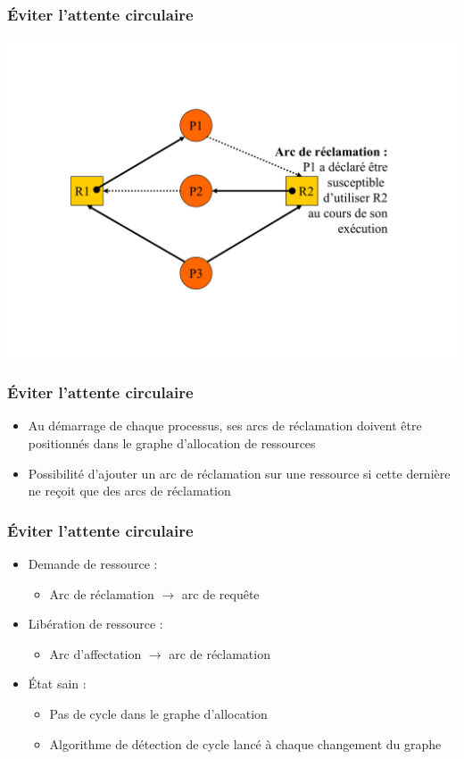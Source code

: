 \begin{frame}
\frametitle{Éviter l’attente circulaire}
\includegraphics[width=.9\textwidth]{../illustration/arc_reclamation.pdf}
\end{frame}

\begin{frame}
\frametitle{Éviter l’attente circulaire}
\begin{itemize}
\item Au démarrage de chaque processus, ses arcs de réclamation doivent être  positionnés dans le graphe d’allocation de ressources
\item Possibilité d’ajouter un arc de réclamation sur une ressource si cette dernière ne reçoit que des arcs de réclamation
\end{itemize}
\end{frame}

\begin{frame}
\frametitle{Éviter l’attente circulaire}
\begin{itemize}
\item Demande de ressource :
\begin{itemize}
\item Arc de réclamation $\to$ arc de requête
\end{itemize}
\item Libération de ressource :
\begin{itemize}
\item Arc d’affectation $\to$ arc de réclamation
\end{itemize}
\item <2>État sain :
\begin{itemize}
\item Pas de cycle dans le graphe d’allocation
\item Algorithme de détection de cycle lancé à chaque changement du graphe
\end{itemize}
\end{itemize}
\end{frame}

